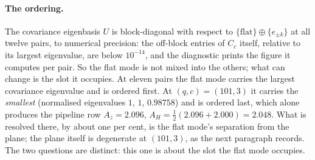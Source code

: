\documentclass[11pt,a4paper]{article}
\begin{document}
    \paragraph{The ordering.}
      The covariance eigenbasis $U$ is block-diagonal with respect to
      $\{\text{flat}\} \oplus \{e_{\pm k}\}$ at all twelve pairs, to numerical precision: the
      off-block entries of $C_c$ itself, relative to its largest eigenvalue, are below $10^{-14}$,
      and the diagnostic prints the figure it computes per pair.
      So the flat mode is not mixed into the others; what can change is the slot it occupies.
      At eleven pairs the flat mode carries the largest covariance eigenvalue and is ordered first.
      At $(q,c) = (101,3)$ it carries the \emph{smallest} (normalised eigenvalues
      $1$, $1$, $0.98758$) and is ordered last, which alone produces the pipeline row
      $A_z = 2.096$, $A_H = \tfrac12(2.096 + 2.000) = 2.048$.
      What is resolved there, by about one per cent, is the flat mode's separation from the plane;
      the plane itself is degenerate at $(101,3)$, as the next paragraph records.
      The two questions are distinct: this one is about the slot the flat mode occupies.
\end{document}
